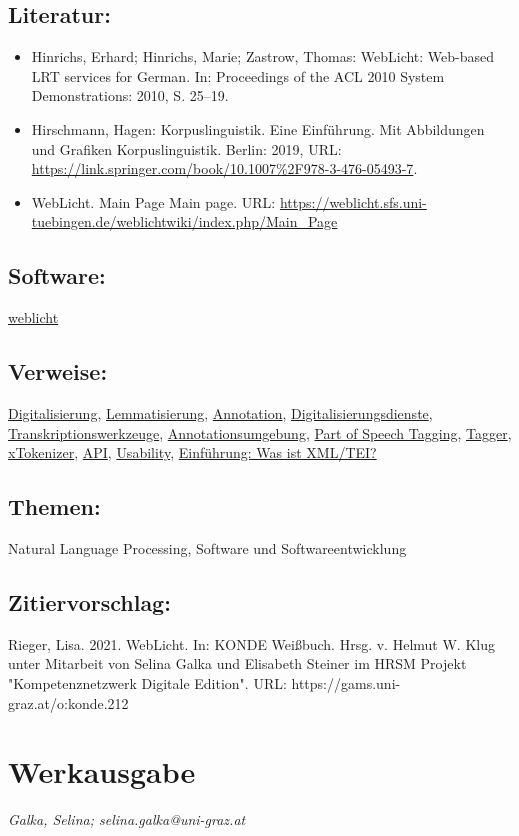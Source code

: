 \documentclass{article}
\begin{document}
        \subsection*{Literatur:}\begin{itemize}\item Hinrichs, Erhard; Hinrichs, Marie; Zastrow, Thomas: WebLicht: Web-based LRT services for German. In: Proceedings of the ACL 2010 System Demonstrations: 2010, S. 25–19.\item Hirschmann, Hagen: Korpuslinguistik. Eine Einführung. Mit Abbildungen und Grafiken Korpuslinguistik. Berlin: 2019, URL: \url{https://link.springer.com/book/10.1007%2F978-3-476-05493-7}.\item WebLicht. Main Page Main page. URL: \url{https://weblicht.sfs.uni-tuebingen.de/weblichtwiki/index.php/Main_Page}\end{itemize}\subsection*{Software:}\href{https://weblicht.sfs.uni-tuebingen.de/weblicht/}{weblicht}\subsection*{Verweise:}\href{https://gams.uni-graz.at/o:konde.60}{Digitalisierung}, \href{https://gams.uni-graz.at/o:konde.115}{Lemmatisierung}, \href{https://gams.uni-graz.at/o:konde.17}{Annotation}, \href{https://gams.uni-graz.at/o:konde.61}{Digitalisierungsdienste}, \href{https://gams.uni-graz.at/o:konde.99}{Transkriptionswerkzeuge}, \href{https://gams.uni-graz.at/o:konde.30}{Annotationsumgebung}, \href{https://gams.uni-graz.at/o:konde.156}{Part of Speech Tagging}, \href{https://gams.uni-graz.at/o:konde.176}{Tagger}, \href{https://gams.uni-graz.at/o:konde.216}{xTokenizer}, \href{https://gams.uni-graz.at/o:konde.31}{API}, \href{https://gams.uni-graz.at/o:konde.205}{Usability}, \href{https://gams.uni-graz.at/o:konde.79}{Einführung: Was ist XML/TEI?}\subsection*{Themen:}Natural Language Processing, Software und Softwareentwicklung\subsection*{Zitiervorschlag:}Rieger, Lisa. 2021. WebLicht. In: KONDE Weißbuch. Hrsg. v. Helmut W. Klug unter Mitarbeit von Selina Galka und Elisabeth Steiner im HRSM Projekt "Kompetenznetzwerk Digitale Edition". URL: https://gams.uni-graz.at/o:konde.212\newpage\section*{Werkausgabe} \emph{Galka, Selina; selina.galka@uni-graz.at }\\
        
\end{document}
